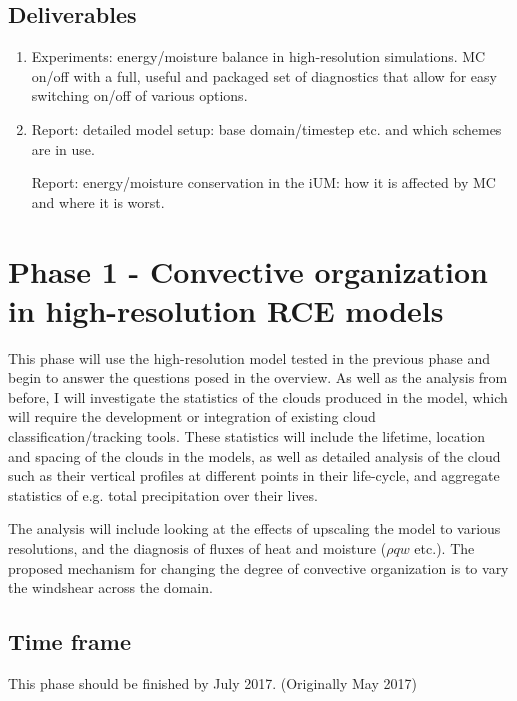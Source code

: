 \documentclass[11pt,a4paper]{article}
\begin{document}
\subsection*{Deliverables}
\begin{enumerate}
    \item Experiments: energy/moisture balance in high-resolution simulations. MC on/off with a full, useful and packaged set of diagnostics that allow for easy switching on/off of various options.
    \item Report: detailed model setup: base domain/timestep etc. and which schemes are in use.
    \item [Report: energy/moisture conservation in the iUM: how it is affected by MC and where it is worst.]
\end{enumerate}

\section*{Phase 1 - Convective organization in high-resolution RCE models}
This phase will use the high-resolution model tested in the previous phase and begin to answer the questions posed in the overview. As well as the analysis from before, I will investigate the statistics of the clouds produced in the model, which will require the development or integration of existing cloud classification/tracking tools. These statistics will include the lifetime, location and spacing of the clouds in the models, as well as detailed analysis of the cloud such as their vertical profiles at different points in their life-cycle, and aggregate statistics of e.g. total precipitation over their lives.

The analysis will include looking at the effects of upscaling the model to various resolutions, and the diagnosis of fluxes of heat and moisture ($\rho q w$ etc.). The proposed mechanism for changing the degree of convective organization is to vary the windshear across the domain.


\subsection*{Time frame}

This phase should be finished by July 2017. (Originally May 2017)
\end{document}
